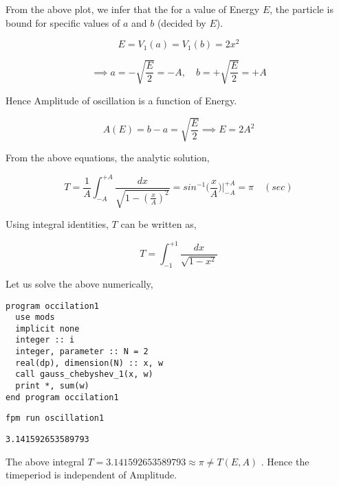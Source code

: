 \documentclass[a4paper,11pt,twoside]{article}
\begin{document}
\begin{center}
\end{center}

From the above plot, we infer that the for a value of Energy \(E\), the particle is bound for specific values of \(a\) and \(b\) (decided by \(E\)).

$$
E = V_1(a)=V_1(b) = 2x^2
$$

$$
 \implies a = - \sqrt{\frac{E}{2}} = -A, \quad b = +\sqrt{\frac{E}{2}} = +A
$$

Hence Amplitude of oscillation is a function of Energy.

$$
A(E) = b-a = \sqrt{\frac{E}{2}} \implies E = 2A^2
$$


\clearpage

From the above equations, the analytic solution,


$$
T = \frac{1}{A}\int_{-A}^{+A} \frac{dx}{\sqrt{1-(\frac{x}{A})^2}} = sin^{-1}{\Big(\frac{x}{A}\Big)} \Big|_{-A}^{ +A} = \pi \quad (sec)
$$

Using integral identities,  \(T\) can be written as,

$$
T = \int_{-1}^{+1} \frac{dx}{\sqrt{1-x^2}}
$$

Let us solve the above numerically,

\begin{verbatim}
program occilation1
  use mods
  implicit none
  integer :: i
  integer, parameter :: N = 2
  real(dp), dimension(N) :: x, w
  call gauss_chebyshev_1(x, w)
  print *, sum(w)
end program occilation1
\end{verbatim}


\begin{verbatim}
fpm run oscillation1
\end{verbatim}

\begin{verbatim}
3.141592653589793
\end{verbatim}


The above integral \(T = 3.141592653589793 \approx \pi \neq T(E,A)\) . Hence the timeperiod is independent of Amplitude.
\end{document}
